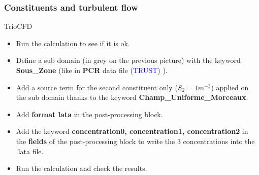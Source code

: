 \documentclass[10pt, hyperref={unicode=true,pdfusetitle, bookmarks=true,bookmarksnumbered=false,bookmarksopen=false, breaklinks=false,pdfborder={0 0 1},backref=true,colorlinks=true,linkcolor=darkblue,pageanchor}]{beamer}
\begin{document}
\begin{frame}
\frametitle{Constituents and turbulent flow}
\begin{block}{TrioCFD}

\begin{itemize}

\item Run the calculation to see if it is ok.

\item Define a sub domain (in grey on the previous picture) with the keyword \textbf{Sous\_Zone} (like in \textbf{PCR} data file (\textcolor{blue}{TRUST}) ).

\item Add a source term for the second constituent only ($S_2=1m^{-3}$) applied on the sub domain thanks to the keyword \textbf{Champ\_Uniforme\_Morceaux}.

\item Add \textbf{format lata} in the post-processing block.

\item Add the keyword \textbf{concentration0, concentration1, concentration2} in the \textbf{fields} of the post-processing block to write the 3 concentrations into the .lata file.

\item Run the calculation and check the results.
\end{itemize}

\end{block}
\end{frame}
\end{document}
